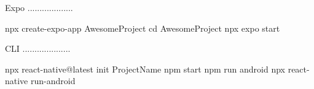 Expo ...................

npx create-expo-app AwesomeProject
cd AwesomeProject
npx expo start

CLI ....................

npx react-native@latest init ProjectName
npm start
npm run android
npx react-native run-android